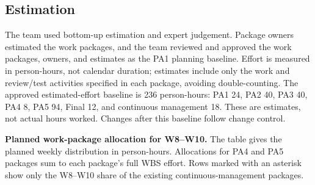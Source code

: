 \subsection{Estimation}

The team used bottom-up estimation and expert judgement. Package owners
estimated the work packages, and the team reviewed and approved the work
packages, owners, and estimates as the PA1 planning baseline. Effort is measured
in person-hours, not calendar duration; estimates include only the work and
review/test activities specified in each package, avoiding double-counting.
The approved estimated-effort baseline is 236 person-hours: PA1 24, PA2 40,
PA3 40, PA4 8, PA5 94, Final 12, and continuous management 18. These are
estimates, not actual hours worked. Changes after this baseline follow change
control.

\textbf{Planned work-package allocation for W8--W10.} The table gives the
planned weekly distribution in person-hours. Allocations for PA4 and PA5
packages sum to each package's full WBS effort. Rows marked with an asterisk
show only the W8--W10 share of the existing continuous-management packages.

